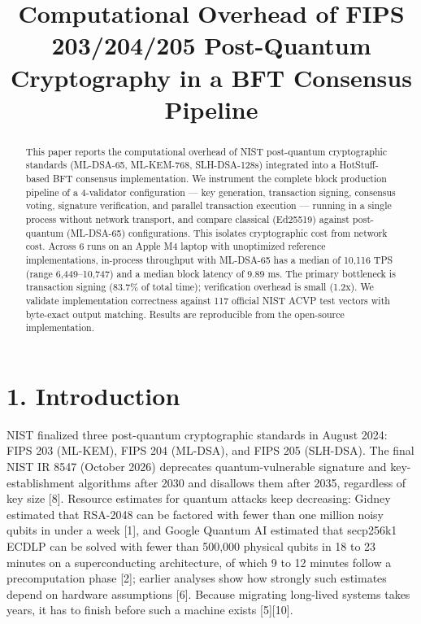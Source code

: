 \documentclass[
]{article}
\title{Computational Overhead of FIPS 203/204/205 Post-Quantum
Cryptography in a BFT Consensus Pipeline}
\author{}
\date{}
\begin{document}
\maketitle

\begin{abstract}

This paper reports the computational overhead of NIST post-quantum
cryptographic standards (ML-DSA-65, ML-KEM-768, SLH-DSA-128s) integrated
into a HotStuff-based BFT consensus implementation. We instrument the
complete block production pipeline of a 4-validator configuration ---
key generation, transaction signing, consensus voting, signature
verification, and parallel transaction execution --- running in a single
process without network transport, and compare classical (Ed25519)
against post-quantum (ML-DSA-65) configurations. This isolates
cryptographic cost from network cost. Across 6 runs on an Apple M4
laptop with unoptimized reference implementations, in-process throughput
with ML-DSA-65 has a median of 10,116 TPS (range 6,449--10,747) and a
median block latency of 9.89 ms. The primary bottleneck is transaction
signing (83.7\% of total time); verification overhead is small (1.2x).
We validate implementation correctness against 117 official NIST ACVP
test vectors with byte-exact output matching. Results are reproducible
from the open-source implementation.

\end{abstract}

\section{1. Introduction}\label{introduction}

NIST finalized three post-quantum cryptographic standards in August
2024: FIPS 203 (ML-KEM), FIPS 204 (ML-DSA), and FIPS 205 (SLH-DSA). The
final NIST IR 8547 (October 2026) deprecates quantum-vulnerable
signature and key-establishment algorithms after 2030 and disallows them
after 2035, regardless of key size {[}8{]}. Resource estimates for
quantum attacks keep decreasing: Gidney estimated that RSA-2048 can be
factored with fewer than one million noisy qubits in under a week
{[}1{]}, and Google Quantum AI estimated that secp256k1 ECDLP can be
solved with fewer than 500,000 physical qubits in 18 to 23 minutes on a
superconducting architecture, of which 9 to 12 minutes follow a
precomputation phase {[}2{]}; earlier analyses show how strongly such
estimates depend on hardware assumptions {[}6{]}. Because migrating
long-lived systems takes years, it has to finish before such a machine
exists {[}5{]}{[}10{]}.
\end{document}
